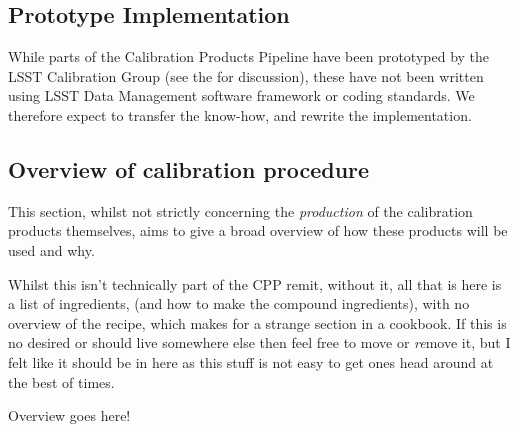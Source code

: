 
\subsection{Prototype Implementation}

While parts of the Calibration Products Pipeline have been prototyped by the LSST Calibration Group (see the \NewPCP for discussion), these have not been written using LSST Data Management software framework or coding standards. We therefore expect to transfer the know-how, and rewrite the implementation.












\subsection{Overview of calibration procedure}
This section, whilst not strictly concerning the \emph{production} of the calibration products themselves, aims to give a broad overview of how these products will be used and why. 
\begin{note}
Whilst this isn't technically part of the CPP remit, without it, all that is here is a list of ingredients, (and how to make the compound ingredients), with no overview of the recipe, which makes for a strange section in a cookbook. If this is no desired or should live somewhere else then feel free to move or \emph{re}move it, but I felt like it should be in here as this stuff is not easy to get ones head around at the best of times.
\end{note}

Overview goes here! \xxx

